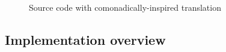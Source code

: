 \begin{figure}[t]
\caption{Source code with comonadically-inspired translation}
\label{fig:essay-transl}
\end{figure}


\subsection{Implementation overview}
\label{sec:impl-essay-tech}

